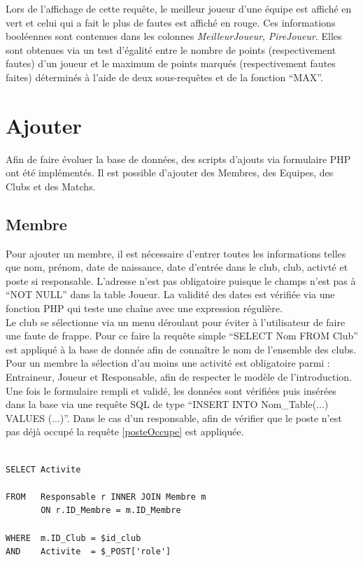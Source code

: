 \documentclass[a4paper»,8pt,french,fleqn]{report}
\begin{document}
Lors de l'affichage de cette requête, le meilleur joueur d'une équipe est affiché en vert et celui qui a fait le plus de fautes est affiché en rouge. Ces informations booléennes sont contenues dans les colonnes \textit{MeilleurJoueur}, \textit{PireJoueur}. Elles sont obtenues via un test d'égalité entre le nombre de points (respectivement fautes) d'un joueur et le maximum de points marqués (respectivement fautes faites) déterminés à l'aide de deux sous-requêtes et de la fonction ``MAX''.

\section{Ajouter}

Afin de faire évoluer la base de données, des scripts d'ajouts via formulaire PHP ont été implémentés. Il est possible d'ajouter des Membres, des Equipes, des Clubs et des Matchs.

\subsection{Membre}
Pour ajouter un membre, il est nécessaire d'entrer toutes les informations telles que nom, prénom, date de naissance, date d'entrée dans le club, club, activté et poste si responsable. L'adresse n'est pas obligatoire puisque le champs n'est pas à ``NOT NULL'' dans la table Joueur. La validité des dates est vérifiée via une fonction PHP qui teste une chaîne avec une expression régulière. \\

Le club se sélectionne via un menu déroulant pour éviter à l'utilisateur de faire une faute de frappe. Pour ce faire la requête simple ``SELECT Nom FROM Club'' est appliqué à la base de donnée afin de connaître le nom de l'ensemble des clubs. \\

 Pour un membre la sélection d'au moins une activité est obligatoire parmi : Entraineur, Joueur et Responsable, afin de respecter le modèle de l'introduction. Une fois le formulaire rempli et validé, les données sont vérifiées puis insérées dans la base via une requête SQL de type ``INSERT INTO Nom\_Table(...) VALUES (...)''. Dans le cas d'un responsable, afin de vérifier que le poste n'est pas déjà occupé la requête \ref{posteOccupe} est appliquée.

\begin{lstlisting}

SELECT Activite

FROM   Responsable r INNER JOIN Membre m
       ON r.ID_Membre = m.ID_Membre

WHERE  m.ID_Club = $id_club
AND    Activite  = $_POST['role']

\end{lstlisting}  
\end{document}
